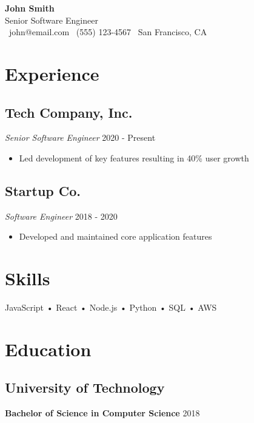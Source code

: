 \documentclass[11pt,a4paper]{article}
\begin{document}
\begin{center}
    {\Huge\textbf{\textcolor{primary}{John Smith}}}\\[4pt]
    {\large\textcolor{accent}{Senior Software Engineer}}\\[4pt]
    \textcolor{text}{
        \faEnvelope\ john@email.com \quad
        \faPhone\ (555) 123-4567 \quad
        \faMapMarker\ San Francisco, CA
    }
\end{center}

\section{Experience}
\subsection*{Tech Company, Inc.}
\textit{\textcolor{accent}{Senior Software Engineer}} \hfill 2020 - Present\\
\begin{itemize}[leftmargin=*]
    \item Led development of key features resulting in 40\% user growth
\end{itemize}

\subsection*{Startup Co.}
\textit{\textcolor{accent}{Software Engineer}} \hfill 2018 - 2020\\
\begin{itemize}[leftmargin=*]
    \item Developed and maintained core application features
\end{itemize}

\section{Skills}
JavaScript • React • Node.js • Python • SQL • AWS

\section{Education}
\subsection*{University of Technology}
\textbf{Bachelor of Science in Computer Science} \hfill 2018
\end{document}
